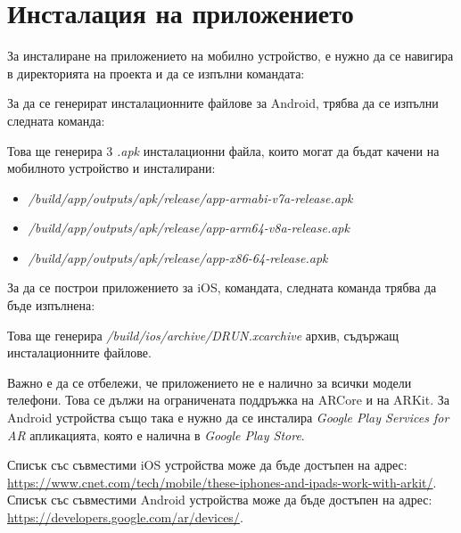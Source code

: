 \section{Инсталация на приложението}
За инсталиране на приложението на мобилно устройство, е нужно да се навигира в директорията на проекта и да се изпълни командата:


За да се генерират инсталационните файлове за Android, трябва да се изпълни следната команда:


Това ще генерира 3 \emph{.apk} инсталационни файла, които могат да бъдат качени на мобилното устройство и инсталирани:
\begin{itemize}
    \item \emph{/build/app/outputs/apk/release/app-armabi-v7a-release.apk}
    \item \emph{/build/app/outputs/apk/release/app-arm64-v8a-release.apk}
    \item \emph{/build/app/outputs/apk/release/app-x86-64-release.apk}
\end{itemize}

За да се построи приложението за iOS, командата, следната команда трябва да бъде изпълнена:


Това ще генерира \emph{/build/ios/archive/DRUN.xcarchive} архив, съдържащ инсталационните файлове.

Важно е да се отбележи, че приложението не е налично за всички модели телефони. Това се дължи на ограничената поддръжка на ARCore и на ARKit. За Android устройства също така е нужно да се инсталира \emph{Google Play Services for AR} апликацията, която е налична в \emph{Google Play Store}.


Списък със съвместими iOS устройства може да бъде достъпен на адрес: \href{https://www.cnet.com/tech/mobile/these-iphones-and-ipads-work-with-arkit/}{https://www.cnet.com/tech/mobile/these-iphones-and-ipads-work-with-arkit/}.
Списък със съвместими Android устройства може да бъде достъпен на адрес: \href{https://developers.google.com/ar/devices/}{https://developers.google.com/ar/devices/}.